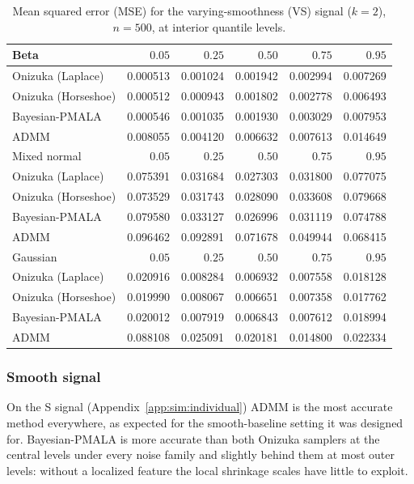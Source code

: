\begin{table}[!htbp]
\centering
\small
\caption{Mean squared error (MSE) for the varying-smoothness (VS) signal ($k=2$), $n=500$, at interior quantile levels.}
\label{tab:vs_int_mse}
\begin{tabular}{lrrrrr}
\toprule
Beta & $0.05$ & $0.25$ & $0.50$ & $0.75$ & $0.95$ \\
\midrule
Onizuka (Laplace) & 0.000513 & 0.001024 & 0.001942 & 0.002994 & 0.007269 \\
Onizuka (Horseshoe) & 0.000512 & 0.000943 & 0.001802 & 0.002778 & 0.006493 \\
Bayesian-PMALA & 0.000546 & 0.001035 & 0.001930 & 0.003029 & 0.007953 \\
ADMM & 0.008055 & 0.004120 & 0.006632 & 0.007613 & 0.014649 \\
\midrule
Mixed normal & $0.05$ & $0.25$ & $0.50$ & $0.75$ & $0.95$ \\
\midrule
Onizuka (Laplace) & 0.075391 & 0.031684 & 0.027303 & 0.031800 & 0.077075 \\
Onizuka (Horseshoe) & 0.073529 & 0.031743 & 0.028090 & 0.033608 & 0.079668 \\
Bayesian-PMALA & 0.079580 & 0.033127 & 0.026996 & 0.031119 & 0.074788 \\
ADMM & 0.096462 & 0.092891 & 0.071678 & 0.049944 & 0.068415 \\
\midrule
Gaussian & $0.05$ & $0.25$ & $0.50$ & $0.75$ & $0.95$ \\
\midrule
Onizuka (Laplace) & 0.020916 & 0.008284 & 0.006932 & 0.007558 & 0.018128 \\
Onizuka (Horseshoe) & 0.019990 & 0.008067 & 0.006651 & 0.007358 & 0.017762 \\
Bayesian-PMALA & 0.020012 & 0.007919 & 0.006843 & 0.007612 & 0.018994 \\
ADMM & 0.088108 & 0.025091 & 0.020181 & 0.014800 & 0.022334 \\
\bottomrule
\end{tabular}
\end{table}

\subsubsection{Smooth signal}
\label{sec:sim:ind:smooth}

On the S signal (Appendix~\ref{app:sim:individual}) ADMM is the most accurate method everywhere, as expected for the smooth-baseline setting it was designed for. Bayesian-PMALA is more accurate than both Onizuka samplers at the central levels under every noise family and slightly behind them at most outer levels: without a localized feature the local shrinkage scales have little to exploit.

